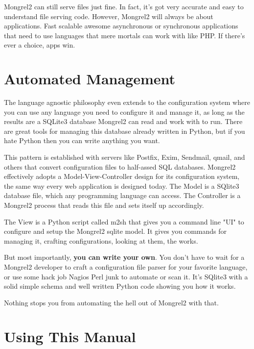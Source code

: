 Mongrel2 can still serve files just fine.  In fact, it's got very accurate and easy
to understand file serving code.  However, Mongrel2 will always be about applications.
Fast scalable awesome asynchronous or synchronous applications that need to use languages
that mere mortals can work with like PHP.  If there's ever a choice, apps win.

\section{Automated Management}

The language agnostic philosophy even extends to the configuration system where
you can use any language you need to configure it and manage it, as long as the
results are a SQLite3 database Mongrel2 can read and work with to run.  There are
great tools for managing this database already written in Python, but if you hate
Python then you can write anything you want.

This pattern is established with servers like Postfix, Exim, Sendmail, qmail,
and others that convert configuration files to half-assed SQL databases.
Mongrel2 effectively adopts a Model-View-Controller design for its
configuration system, the same way every web application is designed today.
The Model is a SQlite3 database file, which any programming language can access.
The Controller is a Mongrel2 process that reads this file and sets itself up
accordingly.

The View is a Python script called m2sh that gives you a command line "UI" to
configure and setup the Mongrel2 sqlite model.  It gives you commands for 
managing it, crafting configurations, looking at them, the works.

But most importantly, {\bf you can write your own}.  You don't have to wait
for a Mongrel2 developer to craft a configuration file parser for your favorite
language, or use some hack job Nagios Perl junk to automate or scan it.  It's
SQlite3 with a solid simple schema and well written Python code showing you how
it works.

Nothing stops you from automating the hell out of Mongrel2 with that.


\section{Using This Manual}



